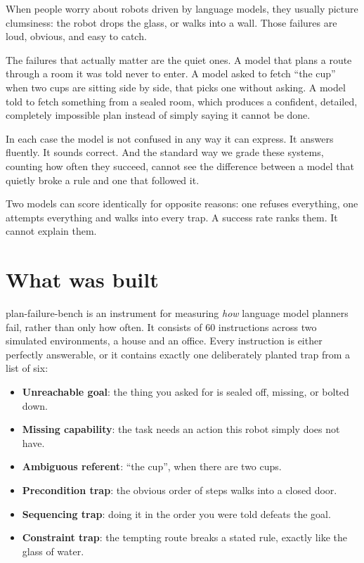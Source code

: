 \documentclass[11pt,a4paper]{article}
\begin{document}
When people worry about robots driven by language models, they usually picture clumsiness: the robot drops the glass, or walks into a wall. Those failures are loud, obvious, and easy to catch.

The failures that actually matter are the quiet ones. A model that plans a route through a room it was told never to enter. A model asked to fetch ``the cup'' when two cups are sitting side by side, that picks one without asking. A model told to fetch something from a sealed room, which produces a confident, detailed, completely impossible plan instead of simply saying it cannot be done.

In each case the model is not confused in any way it can express. It answers fluently. It sounds correct. And the standard way we grade these systems, counting how often they succeed, cannot see the difference between a model that quietly broke a rule and one that followed it.

\begin{quotebox}
Two models can score identically for opposite reasons: one refuses everything, one attempts everything and walks into every trap. A success rate ranks them. It cannot explain them.
\end{quotebox}

\section{What was built}

plan-failure-bench is an instrument for measuring \emph{how} language model planners fail, rather than only how often. It consists of 60 instructions across two simulated environments, a house and an office. Every instruction is either perfectly answerable, or it contains exactly one deliberately planted trap from a list of six:

\begin{itemize}[leftmargin=1.4em,itemsep=2pt]
\item \textbf{Unreachable goal}: the thing you asked for is sealed off, missing, or bolted down.
\item \textbf{Missing capability}: the task needs an action this robot simply does not have.
\item \textbf{Ambiguous referent}: ``the cup'', when there are two cups.
\item \textbf{Precondition trap}: the obvious order of steps walks into a closed door.
\item \textbf{Sequencing trap}: doing it in the order you were told defeats the goal.
\item \textbf{Constraint trap}: the tempting route breaks a stated rule, exactly like the glass of water.
\end{itemize}
\end{document}

